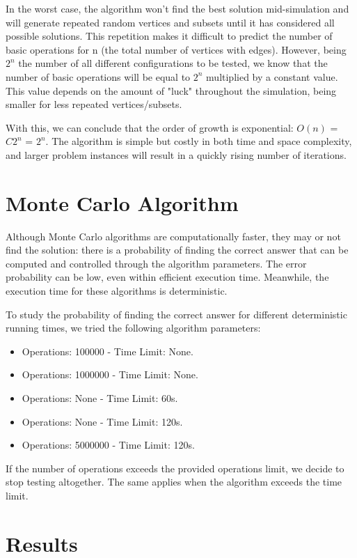\documentclass[]{revdetua}
\begin{document}
In the worst case, the algorithm won't find the best solution mid-simulation and will generate repeated random vertices and subsets until it has considered all possible solutions. This repetition makes it difficult to predict the number of basic operations for n (the total number of vertices with edges). However, being \(2^n\) the number of all different configurations to be tested, we know that the number of basic operations will be equal to \(2^n\) multiplied by a constant value. This value depends on the amount of "luck" throughout the simulation, being smaller for less repeated vertices/subsets. 

With this, we can conclude that the order of growth is exponential: $O(n)$ = \(C 2^n\) = \(2^n\). The algorithm is simple but costly in both time and space complexity, and larger problem instances will result in a quickly rising number of iterations.

\section{Monte Carlo Algorithm}

Although Monte Carlo algorithms are computationally faster, they may or not find the solution: there is a probability of finding the correct answer that can be computed and controlled through the algorithm parameters. The error probability can be low, even within efficient execution time. Meanwhile, the execution time for these algorithms is deterministic.

To study the probability of finding the correct answer for different deterministic running times, we tried the following algorithm parameters:

\begin{itemize}
\item Operations: 100000 - Time Limit: None.
\item Operations: 1000000 - Time Limit: None.
\item Operations: None - Time Limit: 60s.
\item Operations: None - Time Limit: 120s.
\item Operations: 5000000 - Time Limit: 120s.
\end{itemize}

If the number of operations exceeds the provided operations limit, we decide to stop testing altogether. The same applies when the algorithm exceeds the time limit.

\section{Results}
\end{document}
